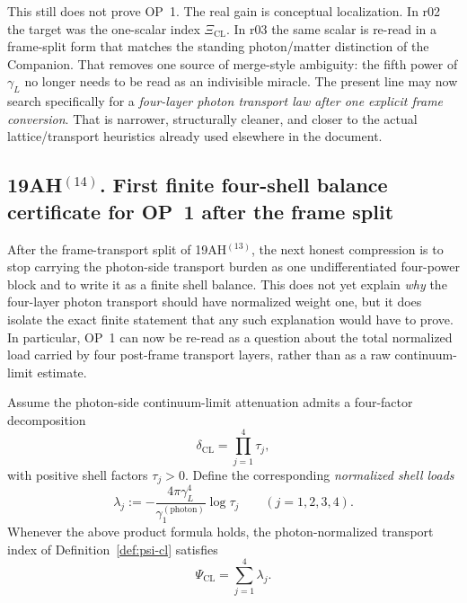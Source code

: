 \begin{remark}
This still does not prove OP~1. The real gain is conceptual localization. In r02 the target was the one-scalar index \(\Xi_{\mathrm{CL}}\). In r03 the same scalar is re-read in a frame-split form that matches the standing photon/matter distinction of the Companion. That removes one source of merge-style ambiguity: the fifth power of \(\gamma_L\) no longer needs to be read as an indivisible miracle. The present line may now search specifically for a \emph{four-layer photon transport law after one explicit frame conversion}. That is narrower, structurally cleaner, and closer to the actual lattice/transport heuristics already used elsewhere in the document.
\end{remark}

\subsection*{19AH$^{(14)}$. First finite four-shell balance certificate for OP~1 after the frame split}
After the frame-transport split of 19AH$^{(13)}$, the next honest compression is to stop carrying the photon-side transport burden as one undifferentiated four-power block and to write it as a finite shell balance. This does not yet explain \emph{why} the four-layer photon transport should have normalized weight one, but it does isolate the exact finite statement that any such explanation would have to prove. In particular, OP~1 can now be re-read as a question about the total normalized load carried by four post-frame transport layers, rather than as a raw continuum-limit estimate.

\begin{definition}
\label{def:op1-four-shell-loads}
Assume the photon-side continuum-limit attenuation admits a four-factor decomposition
\[
  \delta_{\mathrm{CL}} = \prod_{j=1}^4 \tau_j,
\]
with positive shell factors \(\tau_j>0\). Define the corresponding \emph{normalized shell loads}
\[
  \lambda_j := -\frac{4\pi\gamma_L^4}{\gamma_1^{(\mathrm{photon})}}\log \tau_j
  \qquad (j=1,2,3,4).
\]
Whenever the above product formula holds, the photon-normalized transport index of Definition~\ref{def:psi-cl} satisfies
\[
  \Psi_{\mathrm{CL}} = \sum_{j=1}^4 \lambda_j.
\]
\end{definition}

